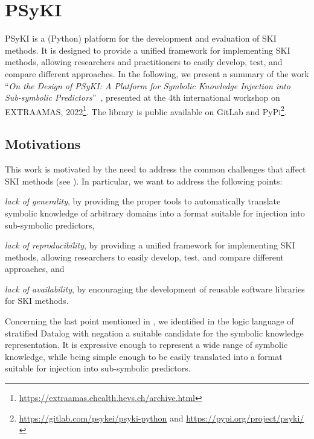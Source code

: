 \section{PSyKI}\label{sec:psyki}
%
\Gls{PSyKI} is a (Python) platform for the development and evaluation of \gls{SKI} methods.
%
It is designed to provide a unified framework for implementing \gls{SKI} methods, allowing researchers and practitioners to easily develop, test, and compare different approaches.
%
In the following, we present a summary of the work ``\emph{On the Design of PSyKI: A Platform for Symbolic Knowledge Injection into Sub-symbolic Predictors}''~\cite{DBLP:conf/atal/MagniniCO22}, presented at the 4th international workshop on \gls{EXTRAAMAS}, 2022\footnote{\url{https://extraamas.ehealth.hevs.ch/archive.html}}.
%
The library is public available on GitLab and PyPi\footnote{\url{https://gitlab.com/psykei/psyki-python} and \url{https://pypi.org/project/psyki/}}.


\subsection{Motivations}\label{subsec:psyki-motivations}
%
This work is motivated by the need to address the common challenges that affect \gls{SKI} methods (see ).
%
In particular, we want to address the following points:
%
\begin{inlinelist}
    \item \emph{lack of generality}, by providing the proper tools to automatically translate symbolic knowledge of arbitrary domains into a format suitable for injection into sub-symbolic predictors,
    \item \emph{lack of reproducibility}, by providing a unified framework for implementing \gls{SKI} methods, allowing researchers to easily develop, test, and compare different approaches, and
    \item \emph{lack of availability}, by encouraging the development of reusable software libraries for \gls{SKI} methods.
\end{inlinelist}
%
Concerning the last point mentioned in , we identified in the logic language of stratified Datalog with negation a suitable candidate for the symbolic knowledge representation.
%
It is expressive enough to represent a wide range of symbolic knowledge, while being simple enough to be easily translated into a format suitable for injection into sub-symbolic predictors.


